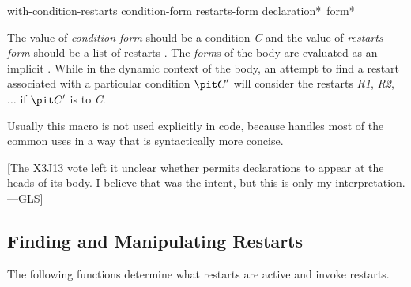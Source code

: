 \begin{defmac}
with-condition-restarts condition-form restarts-form
  {declaration}* {\,form}*

The value of {\it condition-form} should be a condition {\it C} and
the value of {\it restarts-form} should be a list of restarts .
      The {\it form\/}s of the body are evaluated as an implicit .
      While in the dynamic context of the body,
      an attempt to find a restart associated with a particular
      condition ${\it C}'$ will 
      consider the restarts {\it R1}, {\it R2}, $\ldots$ if ${\it C}'$ is  to {\it C}.

     Usually this macro is not used explicitly in code, because
      handles most of the common uses in a way that is
     syntactically more concise.

[The X3J13 vote  left it unclear whether 
permits declarations to appear at the heads of its body.
I believe that was the intent, but this is only my interpretation.---GLS]

\end{defmac}


\subsection{Finding and Manipulating Restarts}

The following functions determine what restarts are
active and invoke restarts.

